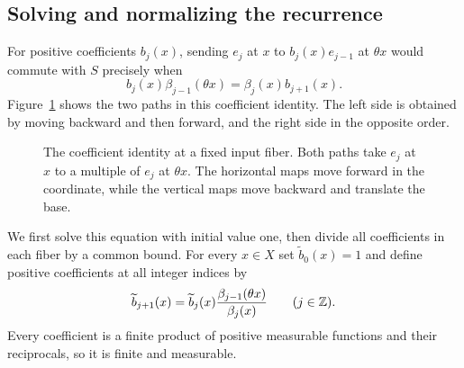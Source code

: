 \subsection{Solving and normalizing the recurrence}
For positive coefficients $b_j(x)$, sending $e_j$ at $x$ to $b_j(x)e_{j-1}$ at $\theta x$ would commute with $S$ precisely when
\[
 b_j(x)\beta_{j-1}(\theta x)=\beta_j(x)b_{j+1}(x).
\]
Figure~\ref{fig:square} shows the two paths in this coefficient identity. The left side is obtained by moving backward and then forward, and the right side in the opposite order.

\begin{figure}[ht]
\centering

\caption{The coefficient identity at a fixed input fiber. Both paths take $e_j$ at $x$ to a multiple of $e_j$ at $\theta x$. The horizontal maps move forward in the coordinate, while the vertical maps move backward and translate the base.}\label{fig:square}
\end{figure}
 We first solve this equation with initial value one, then divide all coefficients in each fiber by a common bound.
For every $x\in X$ set $\widetilde b_0(x)=1$ and define positive coefficients at all integer indices by
\begin{equation}\label{eq:b-recursion}
 \widetilde b_{j+1}(x)
 =\widetilde b_j(x)\frac{\beta_{j-1}(\theta x)}{\beta_j(x)}
 \qquad(j\in\mathbb Z).
\end{equation}
Every coefficient is a finite product of positive measurable functions and their reciprocals, so it is finite and measurable.

